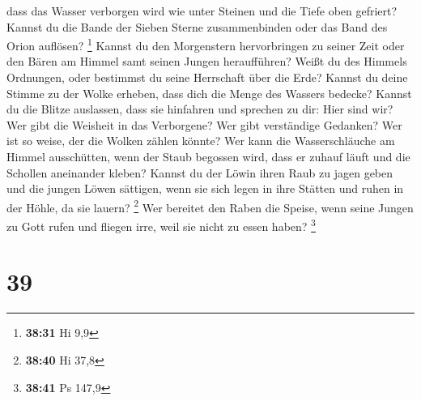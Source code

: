 dass das Wasser verborgen wird wie unter Steinen und die
Tiefe oben gefriert?  Kannst du die Bande der Sieben
Sterne zusammenbinden oder das Band des Orion auflösen? \footnote{\textbf{38:31}
  Hi 9,9}  Kannst du den Morgenstern hervorbringen zu
seiner Zeit oder den Bären am Himmel samt seinen Jungen heraufführen?
 Weißt du des Himmels Ordnungen, oder bestimmst du seine
Herrschaft über die Erde?  Kannst du deine Stimme zu der
Wolke erheben, dass dich die Menge des Wassers bedecke? 
Kannst du die Blitze auslassen, dass sie hinfahren und sprechen zu dir:
Hier sind wir?  Wer gibt die Weisheit in das Verborgene?
Wer gibt verständige Gedanken?  Wer ist so weise, der die
Wolken zählen könnte? Wer kann die Wasserschläuche am Himmel
ausschütten,  wenn der Staub begossen wird, dass er
zuhauf läuft und die Schollen aneinander kleben?  Kannst
du der Löwin ihren Raub zu jagen geben und die jungen Löwen sättigen,
 wenn sie sich legen in ihre Stätten und ruhen in der
Höhle, da sie lauern? \footnote{\textbf{38:40} Hi 37,8} 
Wer bereitet den Raben die Speise, wenn seine Jungen zu Gott rufen und
fliegen irre, weil sie nicht zu essen haben? \footnote{\textbf{38:41} Ps
  147,9}

\hypertarget{section-9}{%
\section{39}\label{section-9}}

